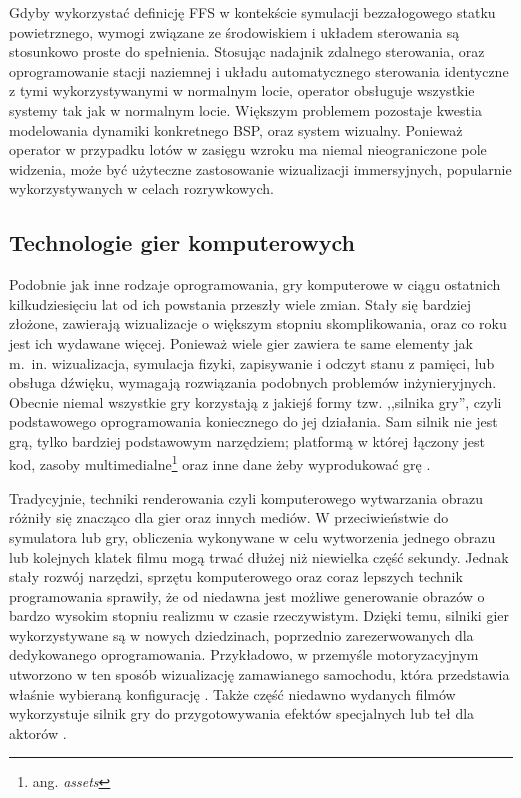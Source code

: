 Gdyby wykorzystać definicję FFS w kontekście symulacji bezzałogowego statku powietrznego, wymogi związane ze środowiskiem i układem sterowania są stosunkowo proste do spełnienia. Stosując nadajnik zdalnego sterowania, oraz oprogramowanie stacji naziemnej i układu automatycznego sterowania identyczne z tymi wykorzystywanymi w normalnym locie, operator obsługuje wszystkie systemy tak jak w normalnym locie. Większym problemem pozostaje kwestia modelowania dynamiki konkretnego BSP, oraz system wizualny. Ponieważ operator w przypadku lotów w zasięgu wzroku ma niemal nieograniczone pole widzenia, może być użyteczne zastosowanie wizualizacji immersyjnych, popularnie wykorzystywanych w celach rozrywkowych.

\subsection{Technologie gier komputerowych}
Podobnie jak inne rodzaje oprogramowania, gry komputerowe w ciągu ostatnich kilkudziesięciu lat od ich powstania przeszły wiele zmian. Stały się bardziej złożone, zawierają wizualizacje o większym stopniu skomplikowania, oraz co roku jest ich wydawane więcej. Ponieważ wiele gier zawiera te same elementy jak m.~in. wizualizacja, symulacja fizyki, zapisywanie i odczyt stanu z pamięci, lub obsługa dźwięku, wymagają rozwiązania podobnych problemów inżynieryjnych. Obecnie niemal wszystkie gry korzystają z jakiejś formy tzw. ,,silnika gry'', czyli podstawowego oprogramowania koniecznego do jej działania. Sam silnik nie jest grą, tylko bardziej podstawowym narzędziem; platformą w której łączony jest kod, zasoby multimedialne\footnote{ang. \emph{assets}} oraz inne dane żeby wyprodukować grę \cite{toftedahl2019}.

Tradycyjnie, techniki renderowania czyli komputerowego wytwarzania obrazu różniły się znacząco dla gier oraz innych mediów. W przeciwieństwie do symulatora lub gry, obliczenia wykonywane w celu wytworzenia jednego obrazu lub kolejnych klatek filmu mogą trwać dłużej niż niewielka część sekundy. Jednak stały rozwój narzędzi, sprzętu komputerowego oraz coraz lepszych technik programowania sprawiły, że od niedawna jest możliwe generowanie obrazów o bardzo wysokim stopniu realizmu w czasie rzeczywistym. Dzięki temu, silniki gier wykorzystywane są w nowych dziedzinach, poprzednio zarezerwowanych dla dedykowanego oprogramowania. Przykładowo, w przemyśle motoryzacyjnym utworzono w ten sposób wizualizację zamawianego samochodu, która przedstawia właśnie wybieraną konfigurację \cite{audi2021}. Także część niedawno wydanych filmów wykorzystuje silnik gry do przygotowywania efektów specjalnych lub teł dla aktorów \cite{nfs2020}.

